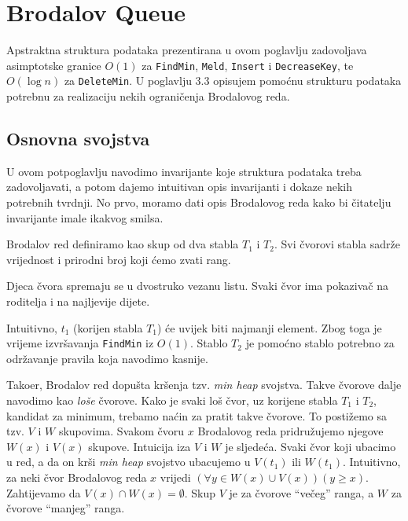\newenvironment{myindentpar}[1]%
 {\begin{list}{}%
         {\setlength{\leftmargin}{#1}}%
         \item[]%
 }
 {\end{list}}

\chapter{Brodalov Queue}

Apstraktna struktura podataka prezentirana u ovom poglavlju zadovoljava asimptotske granice $O(1)$ za \texttt{FindMin}, \texttt{Meld}, \texttt{Insert} i \texttt{DecreaseKey}, te $O(\log n)$ za \texttt{DeleteMin}.
U poglavlju 3.3 opisujem pomo\'{c}nu strukturu podataka potrebnu za realizaciju nekih ograni\v{c}enja Brodalovog reda.

\section{Osnovna svojstva}

U ovom potpoglavlju navodimo invarijante koje struktura podataka treba zadovoljavati, a potom dajemo intuitivan opis invarijanti i dokaze nekih potrebnih tvrdnji.
No prvo, moramo dati opis Brodalovog reda kako bi \v{c}itatelju invarijante imale ikakvog smilsa.

Brodalov red definiramo kao skup od dva stabla $T_{1}$ i $T_{2}$.
Svi \v{c}vorovi stabla sadr\v{z}e vrijednost i prirodni broj koji \'{c}emo zvati rang.

Djeca \v{c}vora spremaju se u dvostruko vezanu listu.
Svaki \v{c}vor ima pokaziva\v{c} na roditelja i na najljevije dijete.

Intuitivno, $t_{1}$ (korijen stabla $T_{1}$) \'{c}e uvijek biti najmanji element. Zbog toga je vrijeme izvr\v{s}avanja \texttt{FindMin} iz $O(1)$.
Stablo $T_{2}$ je pomo\'{c}no stablo potrebno za odr\v{z}avanje pravila koja navodimo kasnije.

Tako\dj er, Brodalov red dopu\v{s}ta kr\v{s}enja tzv. \emph{min heap} svojstva.
Takve \v{c}vorove dalje navodimo kao \emph{lo\v{s}e} \v{c}vorove.
Kako je svaki lo\v{s} \v{c}vor, uz korijene stabla $T_{1}$ i $T_{2}$, kandidat za minimum, trebamo na\'{c}in za pratit takve \v{c}vorove.
To posti\v{z}emo sa tzv. $V$ i $W$ skupovima.
Svakom \v{c}voru $x$ Brodalovog reda pridru\v{z}ujemo njegove $W(x)$ i $V(x)$ skupove.
Intuicija iza $V$ i $W$ je sljede\'{c}a.
Svaki \v{c}vor koji ubacimo u red, a da on kr\v{s}i \emph{min heap} svojstvo ubacujemo u $V(t_{1})$ ili $W(t_{1})$.
Intuitivno, za neki \v{c}vor Brodalovog reda $x$ vrijedi $(\forall y \in W(x) \cup V(x))(y \ge x)$.
Zahtijevamo da $V(x) \cap W(x) = \emptyset$.
Skup $V$ je za \v{c}vorove ``ve\v{c}eg'' ranga, a $W$ za \v{c}vorove ``manjeg'' ranga.

